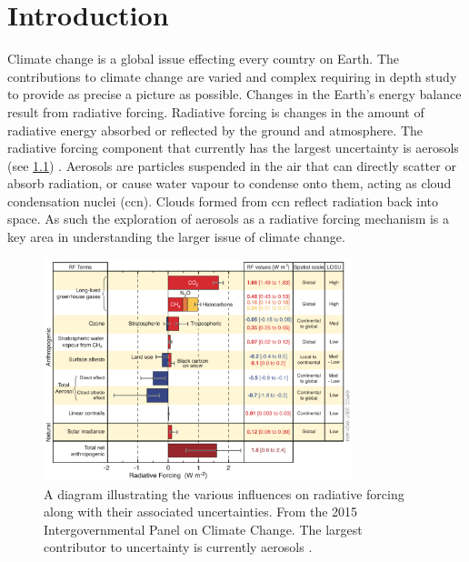\chapter{Introduction}
\label{ch:intro}


Climate change is a global issue effecting every country on Earth. The contributions to climate change are varied and complex requiring in depth study to provide as precise a picture as possible. Changes in the Earth's energy balance result from radiative forcing. Radiative forcing is changes in the amount of radiative energy absorbed or reflected by the ground and atmosphere. The radiative forcing component that currently has the largest uncertainty is aerosols (see \cref{fig:radforc}) \citep{intergovernmentalpanelonclimatechange:2015fa}. Aerosols are particles suspended in the air that can directly scatter or absorb radiation, or cause water vapour to condense onto them, acting as cloud condensation nuclei (\gls{ccn}). Clouds formed from \gls{ccn} reflect radiation back into space. As such the exploration of aerosols as a radiative forcing mechanism is a key area in understanding the larger issue of climate change.

\begin{figure}[!htb]
 	\centering
 	\includegraphics[width=0.8\textwidth,natwidth=1730,natheight=1248]{Fig/Radiative_Forcing.png}
 	\caption{A diagram illustrating the various influences on radiative forcing along with their associated uncertainties. From the 2015 Intergovernmental Panel on Climate Change. The largest contributor to uncertainty is currently aerosols \citep{intergovernmentalpanelonclimatechange:2015fa}.}
 	\label{fig:radforc}
\end{figure}

